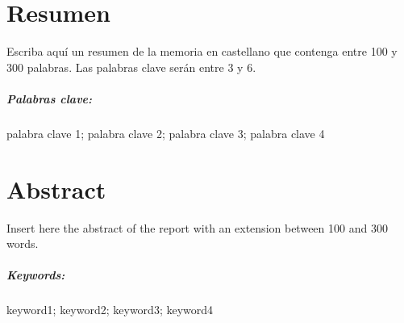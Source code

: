 \chapter*{Resumen}

Escriba aquí un resumen de la memoria en castellano que contenga entre 100 y 300 palabras. Las palabras clave serán entre 3 y 6.

\paragraph{Palabras clave:} palabra clave 1; palabra clave 2; palabra clave 3; palabra clave 4

\chapter*{Abstract}

Insert here the abstract of the report with an extension between 100 and 300 words.

\paragraph{Keywords:} keyword1; keyword2; keyword3; keyword4
